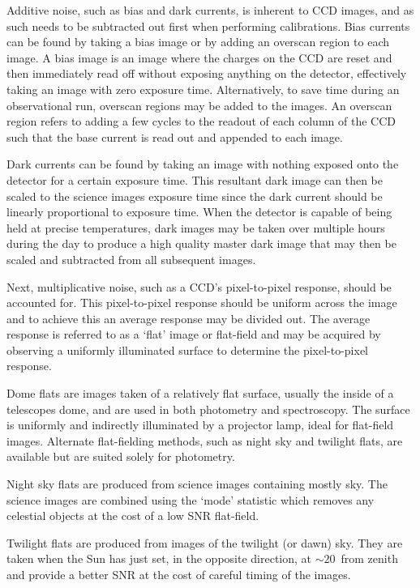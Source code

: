 \pagebreak

Additive noise, such as bias and dark currents, is inherent to \gls{CCD} images, and as such needs to be subtracted out first when performing calibrations.
Bias currents can be found by taking a bias image or by adding an overscan region to each image.
A bias image is an image where the charges on the \gls{CCD} are reset and then immediately read off without exposing anything on the detector, effectively taking an image with zero exposure time.
Alternatively, to save time during an observational run, overscan regions may be added to the images.
An overscan region refers to adding a few cycles to the readout of each column of the \gls{CCD} such that the base current is read out and appended to each image.

Dark currents can be found by taking an image with nothing exposed onto the detector for a certain exposure time.
This resultant dark image can then be scaled to the science images exposure time since the dark current should be linearly proportional to exposure time.
When the detector is capable of being held at precise temperatures, dark images may be taken over multiple hours during the day to produce a high quality master dark image that may then be scaled and subtracted from all subsequent images.

Next, multiplicative noise, such as a \gls{CCD}'s pixel-to-pixel response, should be accounted for.
This pixel-to-pixel response should be uniform across the image and to achieve this an average response may be divided out.
The average response is referred to as a `flat' image or flat-field and may be acquired by observing a uniformly illuminated surface to determine the pixel-to-pixel response.

Dome flats are images taken of a relatively flat surface, usually the inside of a telescopes dome, and are used in both photometry and spectroscopy.
The surface is uniformly and indirectly illuminated by a projector lamp, ideal for flat-field images.
Alternate flat-fielding methods, such as night sky and twilight flats, are available but are suited solely for photometry.

Night sky flats are produced from science images containing mostly sky.
The science images are combined using the `mode' statistic which removes any celestial objects at the cost of a low \gls{SNR} flat-field.

Twilight flats are produced from images of the twilight (or dawn) sky.
They are taken when the Sun has just set, in the opposite direction, at $\sim 20$\degree\ from zenith and provide a better \gls{SNR} at the cost of careful timing of the images.

